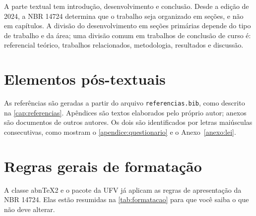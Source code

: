 A parte textual tem introdução, desenvolvimento e conclusão. Desde a edição de 2024, a NBR 14724 determina que o trabalho seja organizado em seções, e não em capítulos. A divisão do desenvolvimento em seções primárias depende do tipo de trabalho e da área; uma divisão comum em trabalhos de conclusão de curso é: referencial teórico, trabalhos relacionados, metodologia, resultados e discussão.

\section{Elementos pós-textuais}\label{sec:pos-textuais}

As referências são geradas a partir do arquivo \texttt{referencias.bib}, como descrito na \autoref{cap:referencias}. Apêndices são textos elaborados pelo próprio autor; anexos são documentos de outros autores. Os dois são identificados por letras maiúsculas consecutivas, como mostram o \autoref{apendice:questionario} e o Anexo~\ref{anexo:lei}.

\section{Regras gerais de formatação}\label{sec:formatacao}

A classe abn\TeX2 e o pacote da UFV já aplicam as regras de apresentação da NBR 14724. Elas estão resumidas na \autoref{tab:formatacao} para que você saiba o que não deve alterar.

\begin{table}[htbp]
\end{table}

